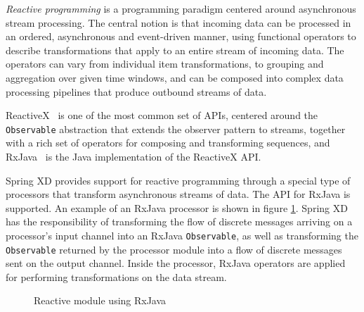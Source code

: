 \emph{Reactive programming} is a programming paradigm centered around asynchronous
stream processing. The central notion is that incoming data can be processed in an
ordered, asynchronous and event-driven manner, using functional operators to describe
transformations that apply to an entire stream of incoming data. The operators can
vary from individual item transformations, to grouping and aggregation over given
time windows, and can be composed into complex data processing pipelines that produce
outbound streams of data.

ReactiveX~\cite{reactivex} is one of the most common set of APIs, centered around
the \texttt{Observable} abstraction that extends the observer pattern to streams,
together with a rich set of operators for composing and transforming sequences, and
RxJava~\cite{rxjava} is the Java implementation of the ReactiveX API.

Spring XD provides support for reactive programming \linebreak
through a special type of processors that transform asynchronous
streams of data. The API for RxJava is supported. An example of an RxJava
processor is shown in figure \ref{fig:rxjava}.
Spring XD has the responsibility of transforming the
flow of discrete messages arriving on a processor's input channel into an
RxJava \texttt{Observable}, as well as transforming the \texttt{Observable}
returned by the processor module into a flow of discrete messages sent on
the output channel. Inside the processor, RxJava operators are applied for
performing transformations on the data stream.

\begin{figure}[ht]
\centering
{}
\caption{Reactive module using RxJava}
\label{fig:rxjava}
\end{figure}
